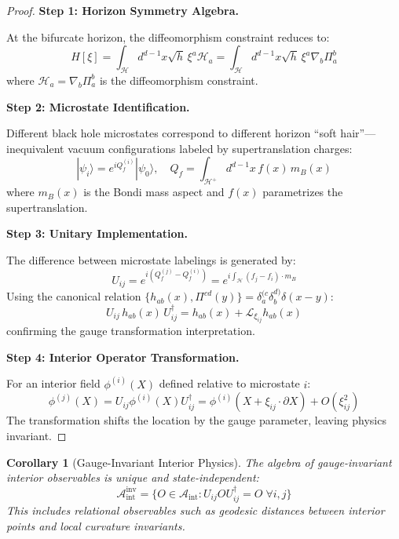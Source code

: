 \documentclass[12pt,a4paper]{article}
\newtheorem{corollary}[theorem]{Corollary}
\begin{document}
\begin{proof}
\textbf{Step 1: Horizon Symmetry Algebra.}

At the bifurcate horizon, the diffeomorphism constraint reduces to:
\begin{equation}
H[\xi] = \int_{\mathcal{H}} d^{d-1}x \sqrt{h} \, \xi^a \mathcal{H}_a = \int_{\mathcal{H}} d^{d-1}x \sqrt{h} \, \xi^a \nabla_b \Pi^b_a
\end{equation}
where $\mathcal{H}_a = \nabla_b \Pi^b_a$ is the diffeomorphism constraint.

\textbf{Step 2: Microstate Identification.}

Different black hole microstates correspond to different horizon ``soft hair''---inequivalent vacuum configurations labeled by supertranslation charges:
\begin{equation}
|\psi_i\rangle = e^{i Q_f^{(i)}}|\psi_0\rangle, \quad Q_f = \int_{\mathcal{H}^+} d^{d-1}x \, f(x) \, m_B(x)
\end{equation}
where $m_B(x)$ is the Bondi mass aspect and $f(x)$ parametrizes the supertranslation.

\textbf{Step 3: Unitary Implementation.}

The difference between microstate labelings is generated by:
\begin{equation}
U_{ij} = e^{i(Q_f^{(j)} - Q_f^{(i)})} = e^{i \int_\mathcal{H} (f_j - f_i) \cdot m_B}
\end{equation}
Using the canonical relation $\{h_{ab}(x), \Pi^{cd}(y)\} = \delta^{(c}_a \delta^{d)}_b \delta(x-y)$:
\begin{equation}
U_{ij} \, h_{ab}(x) \, U_{ij}^\dagger = h_{ab}(x) + \mathcal{L}_{\xi_{ij}} h_{ab}(x)
\end{equation}
confirming the gauge transformation interpretation.

\textbf{Step 4: Interior Operator Transformation.}

For an interior field $\phi^{(i)}(X)$ defined relative to microstate $i$:
\begin{equation}
\phi^{(j)}(X) = U_{ij} \phi^{(i)}(X) U_{ij}^\dagger = \phi^{(i)}(X + \xi_{ij} \cdot \partial X) + O(\xi_{ij}^2)
\end{equation}
The transformation shifts the location by the gauge parameter, leaving physics invariant.
\end{proof}

\begin{corollary}[Gauge-Invariant Interior Physics]
The algebra of gauge-invariant interior observables is unique and state-independent:
\begin{equation}
\mathcal{A}_{\text{int}}^{\text{inv}} = \{ O \in \mathcal{A}_{\text{int}} : U_{ij} O U_{ij}^\dagger = O \; \forall i,j \}
\end{equation}
This includes relational observables such as geodesic distances between interior points and local curvature invariants.
\end{corollary}
\end{document}

